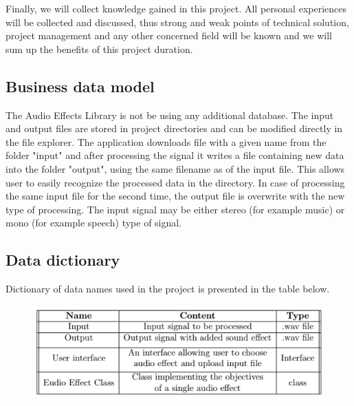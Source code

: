 \documentclass[12pt]{article}
\begin{document}
	Finally, we will collect knowledge gained in this project. All personal experiences will be collected and discussed, thus strong and weak points of technical solution, project management and any other concerned field will be known and we will sum up the benefits of this project duration.

\subsection{Business data model}

The Audio Effects Library is not be using any additional database. The input and output files are stored in project directories and can be modified directly in the file explorer. The application downloads file with a given name from the folder "input" and after processing the signal it writes a file containing new data into the folder "output", using the same filename as of the input file. This allows user to easily recognize the processed data in the directory. In case of processing the same input file for the second time, the output file is overwrite with the new type of processing. The input signal may be either stereo (for example music) or mono (for example speech) type of signal.

\subsection{Data dictionary}

Dictionary of data names used in the project is presented in the table below.

\begin{figure}[H]
		\includegraphics[width=1\textwidth, center]{Data dictionary}
\end{figure}

\end{document}
